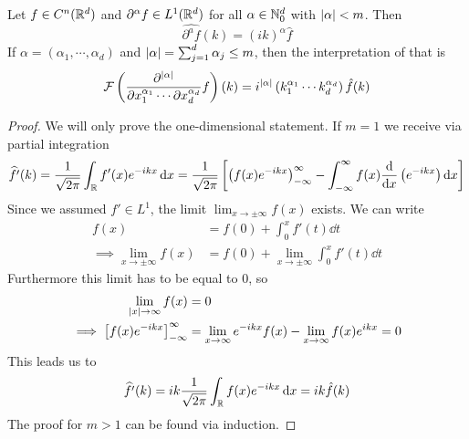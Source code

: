 \documentclass[../../script.tex]{subfiles}
\begin{document}
\begin{thm}
    Let $f \in C^n(\mathbb{R}^d)$ and $\partial^{\alpha} f \in L^1(\mathbb{R}^d)$ for all $\alpha \in \mathbb{N}_0^d$ with $\abs{\alpha} < m$. Then 
    \[
        \widehat{\partial^a f}(k) = (ik)^{\alpha}\hat{f}
    \]
    If $\alpha = (\alpha_1, \cdots, \alpha_d)$ and $\abs{\alpha} = \sum_{j=1}^d \alpha_j \le m$, then the interpretation of that is 
    \[
        \mathcal{F}\left(\frac{\partial^{\abs{\alpha}}}{\partial x_1^{\alpha_1} \cdots \partial x_d^{\alpha_d}} f\right)(k) = i^{\abs{\alpha}} \left(k_1^{\alpha_1} \cdots k_d^{\alpha_d}\right) \hat{f}(k)
    \]
\end{thm}
\begin{proof}
   We will only prove the one-dimensional statement. If $m = 1$ we receive via partial integration 
   \begin{equation}
       \widehat{f'}(k) = \frac{1}{\sqrt{2\pi}} \int_{\mathbb{R}} f'(x) e^{-ikx} \dd{x} = \frac{1}{\sqrt{2\pi}} \left[ \left(f(x) e^{-ikx}\right)_{-\infty}^{\infty} - \int_{-\infty}^{\infty} f(x) \dv{x} \left(e^{-ikx}\right) \dd{x} \right]
   \end{equation} 
   Since we assumed $f' \in L^1$, the limit $\lim_{x \rightarrow \pm\infty} f(x)$ exists. We can write 
   \begin{align}
       f(x) &= f(0) + \int_0^x f'(t) \dd{t} \\
       \implies \lim_{x \rightarrow \pm\infty} f(x) &= f(0) + \lim_{x \rightarrow \pm\infty} \int_0^x f'(t) \dd{t}
   \end{align}
   Furthermore this limit has to be equal to $0$, so 
   \begin{align}
       \lim_{\abs{x} \rightarrow \infty} f(x) &= 0 \\
        \implies \left[f(x) e^{-ikx}\right]_{-\infty}^{\infty} &= \lim_{x \rightarrow \infty} e^{-ikx} f(x) - \lim_{x \rightarrow \infty} f(x)e^{ikx} = 0
   \end{align}
   This leads us to 
   \begin{equation}
       \widehat{f'}(k) = ik \frac{1}{\sqrt{2\pi}} \int_{\mathbb{R}} f(x) e^{-ikx} \dd{x} = ik\hat{f}(k)
   \end{equation}
   The proof for $m > 1$ can be found via induction.
\end{proof}
\end{document}
